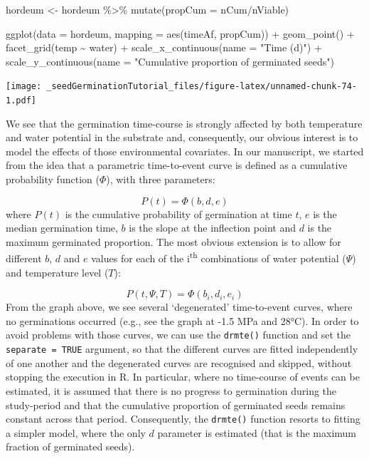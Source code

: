 \documentclass[
]{book}
\newenvironment{Shaded}{\begin{snugshade}}{\end{snugshade}}
\newcommand{\AttributeTok}[1]{\textcolor[rgb]{0.77,0.63,0.00}{#1}}
\newcommand{\FunctionTok}[1]{\textcolor[rgb]{0.00,0.00,0.00}{#1}}
\newcommand{\NormalTok}[1]{#1}
\newcommand{\OtherTok}[1]{\textcolor[rgb]{0.56,0.35,0.01}{#1}}
\newcommand{\SpecialCharTok}[1]{\textcolor[rgb]{0.00,0.00,0.00}{#1}}
\newcommand{\StringTok}[1]{\textcolor[rgb]{0.31,0.60,0.02}{#1}}
\begin{document}
\begin{Shaded}
\begin{Highlighting}[]
\NormalTok{hordeum }\OtherTok{\textless{}{-}}\NormalTok{ hordeum }\SpecialCharTok{\%\textgreater{}\%} 
  \FunctionTok{mutate}\NormalTok{(}\AttributeTok{propCum =}\NormalTok{ nCum}\SpecialCharTok{/}\NormalTok{nViable)}

\FunctionTok{ggplot}\NormalTok{(}\AttributeTok{data =}\NormalTok{ hordeum, }\AttributeTok{mapping =} \FunctionTok{aes}\NormalTok{(timeAf, propCum)) }\SpecialCharTok{+}
  \FunctionTok{geom\_point}\NormalTok{() }\SpecialCharTok{+}
  \FunctionTok{facet\_grid}\NormalTok{(temp }\SpecialCharTok{\textasciitilde{}}\NormalTok{ water) }\SpecialCharTok{+}
  \FunctionTok{scale\_x\_continuous}\NormalTok{(}\AttributeTok{name =} \StringTok{"Time (d)"}\NormalTok{) }\SpecialCharTok{+}
  \FunctionTok{scale\_y\_continuous}\NormalTok{(}\AttributeTok{name =} \StringTok{"Cumulative proportion of germinated seeds"}\NormalTok{)}
\end{Highlighting}
\end{Shaded}

\texttt{[image: \_seedGerminationTutorial\_files/figure-latex/unnamed-chunk-74-1.pdf]}

We see that the germination time-course is strongly affected by both temperature and water potential in the substrate and, consequently, our obvious interest is to model the effects of those environmental covariates. In our manuscript, we started from the idea that a parametric time-to-event curve is defined as a cumulative probability function (\(\Phi\)), with three parameters:

\[P(t) = \Phi \left( b, d, e \right)\]
where \(P(t)\) is the cumulative probability of germination at time \(t\), \(e\) is the median germination time, \(b\) is the slope at the inflection point and \(d\) is the maximum germinated proportion. The most obvious extension is to allow for different \(b\), \(d\) and \(e\) values for each of the i\textsuperscript{th} combinations of water potential (\(\Psi\)) and temperature level (\(T\)):

\[P(t, \Psi, T) = \Phi \left( b_i, d_i, e_i \right)\]
From the graph above, we see several `degenerated' time-to-event curves, where no germinations occurred (e.g., see the graph at -1.5 MPa and 28°C). In order to avoid problems with those curves, we can use the \texttt{drmte()} function and set the \texttt{separate\ =\ TRUE} argument, so that the different curves are fitted independently of one another and the degenerated curves are recognised and skipped, without stopping the execution in R. In particular, where no time-course of events can be estimated, it is assumed that there is no progress to germination during the study-period and that the cumulative proportion of germinated seeds remains constant across that period. Consequently, the \texttt{drmte()} function resorts to fitting a simpler model, where the only \(d\) parameter is estimated (that is the maximum fraction of germinated seeds).
\end{document}
